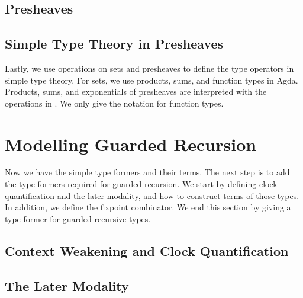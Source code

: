 \documentclass[a4paper,UKenglish,cleveref, autoref,numberwithinsect]{lipics-v2019}
\begin{document}
\label{sec:presheaf_sem}
\subsection{Presheaves}
\label{sec:presheaves}








\subsection{Simple Type Theory in Presheaves}












Lastly, we use operations on sets and presheaves to define the type operators in simple type theory.
For sets, we use products, sums, and function types in Agda.
Products, sums, and exponentials of presheaves are interpreted with the operations in .
We only give the notation for function types.



\section{Modelling Guarded Recursion}
\label{sec:guarded}
Now we have the simple type formers and their terms.
The next step is to add the type formers required for guarded recursion.
We start by defining clock quantification and the later modality, and how to construct terms of those types.
In addition, we define the fixpoint combinator.
We end this section by giving a type former for guarded recursive types.

\subsection{Context Weakening and Clock Quantification}



\subsection{The Later Modality}



\end{document}
